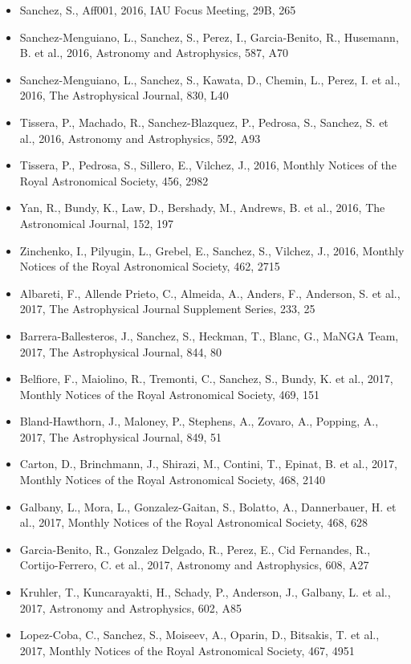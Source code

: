 \documentclass{letter}
\begin{document}
\begin{enumerate}
\begin{itemize}
\item Sanchez, S., Aff001, 2016, IAU Focus Meeting, 29B, 265
\item Sanchez-Menguiano, L., Sanchez, S., Perez, I., Garcia-Benito, R., Husemann, B. et al., 2016, Astronomy and Astrophysics, 587, A70
\item Sanchez-Menguiano, L., Sanchez, S., Kawata, D., Chemin, L., Perez, I. et al., 2016, The Astrophysical Journal, 830, L40
\item Tissera, P., Machado, R., Sanchez-Blazquez, P., Pedrosa, S., Sanchez, S. et al., 2016, Astronomy and Astrophysics, 592, A93
\item Tissera, P., Pedrosa, S., Sillero, E., Vilchez, J., 2016, Monthly Notices of the Royal Astronomical Society, 456, 2982
\item Yan, R., Bundy, K., Law, D., Bershady, M., Andrews, B. et al., 2016, The Astronomical Journal, 152, 197
\item Zinchenko, I., Pilyugin, L., Grebel, E., Sanchez, S., Vilchez, J., 2016, Monthly Notices of the Royal Astronomical Society, 462, 2715
\item Albareti, F., Allende Prieto, C., Almeida, A., Anders, F., Anderson, S. et al., 2017, The Astrophysical Journal Supplement Series, 233, 25
\item Barrera-Ballesteros, J., Sanchez, S., Heckman, T., Blanc, G., MaNGA Team, 2017, The Astrophysical Journal, 844, 80
\item Belfiore, F., Maiolino, R., Tremonti, C., Sanchez, S., Bundy, K. et al., 2017, Monthly Notices of the Royal Astronomical Society, 469, 151
\item Bland-Hawthorn, J., Maloney, P., Stephens, A., Zovaro, A., Popping, A., 2017, The Astrophysical Journal, 849, 51
\item Carton, D., Brinchmann, J., Shirazi, M., Contini, T., Epinat, B. et al., 2017, Monthly Notices of the Royal Astronomical Society, 468, 2140
\item Galbany, L., Mora, L., Gonzalez-Gaitan, S., Bolatto, A., Dannerbauer, H. et al., 2017, Monthly Notices of the Royal Astronomical Society, 468, 628
\item Garcia-Benito, R., Gonzalez Delgado, R., Perez, E., Cid Fernandes, R., Cortijo-Ferrero, C. et al., 2017, Astronomy and Astrophysics, 608, A27
\item Kruhler, T., Kuncarayakti, H., Schady, P., Anderson, J., Galbany, L. et al., 2017, Astronomy and Astrophysics, 602, A85
\item Lopez-Coba, C., Sanchez, S., Moiseev, A., Oparin, D., Bitsakis, T. et al., 2017, Monthly Notices of the Royal Astronomical Society, 467, 4951

\end{itemize}
\end{enumerate}
\end{document}
